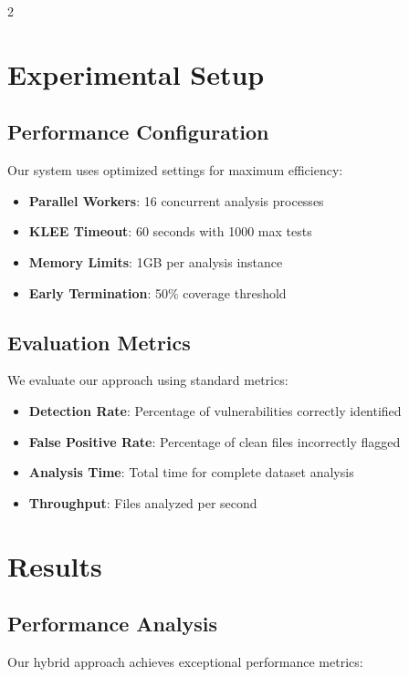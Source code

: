 \documentclass[12pt,a4paper]{article}
\begin{document}
\begin{multicols}{2}
\section{Experimental Setup}

\subsection{Performance Configuration}

Our system uses optimized settings for maximum efficiency:

\begin{itemize}
    \item \textbf{Parallel Workers}: 16 concurrent analysis processes
    \item \textbf{KLEE Timeout}: 60 seconds with 1000 max tests
    \item \textbf{Memory Limits}: 1GB per analysis instance
    \item \textbf{Early Termination}: 50\% coverage threshold
\end{itemize}

\subsection{Evaluation Metrics}

We evaluate our approach using standard metrics:

\begin{itemize}
    \item \textbf{Detection Rate}: Percentage of vulnerabilities correctly identified
    \item \textbf{False Positive Rate}: Percentage of clean files incorrectly flagged
    \item \textbf{Analysis Time}: Total time for complete dataset analysis
    \item \textbf{Throughput}: Files analyzed per second
\end{itemize}

\section{Results}

\subsection{Performance Analysis}

Our hybrid approach achieves exceptional performance metrics:


\end{multicols}
\end{document}
